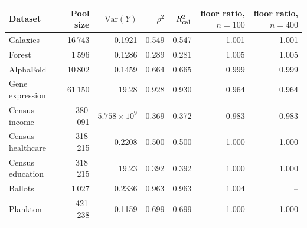 \begin{tabular}{lrrrrrr}
\toprule
Dataset & Pool size & $\mathrm{Var}(Y)$ & $\rho^2$ & $R^2_{\rm cal}$ & floor ratio, $n=100$ & floor ratio, $n=400$ \\
\midrule
Galaxies & 16\,743 & 0.1921 & 0.549 & 0.547 & 1.001 & 1.001 \\
Forest & 1\,596 & 0.1286 & 0.289 & 0.281 & 1.005 & 1.005 \\
AlphaFold & 10\,802 & 0.1459 & 0.664 & 0.665 & 0.999 & 0.999 \\
Gene expression & 61\,150 & 19.28 & 0.928 & 0.930 & 0.964 & 0.964 \\
Census income & 380\,091 & $5.758\times10^{9}$ & 0.369 & 0.372 & 0.983 & 0.983 \\
Census healthcare & 318\,215 & 0.2208 & 0.500 & 0.500 & 1.000 & 1.000 \\
Census education & 318\,215 & 19.23 & 0.392 & 0.392 & 1.000 & 1.000 \\
Ballots & 1\,027 & 0.2336 & 0.963 & 0.963 & 1.004 & -- \\
Plankton & 421\,238 & 0.1159 & 0.699 & 0.699 & 1.000 & 1.000 \\
\bottomrule
\end{tabular}
